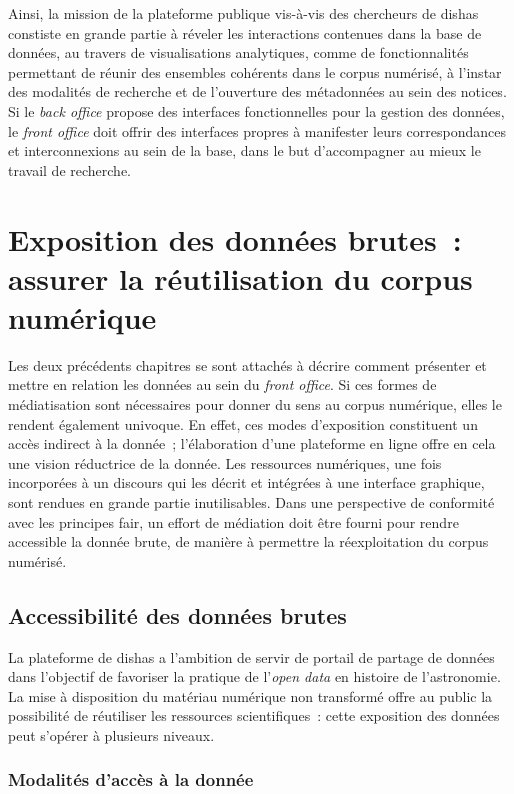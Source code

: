 \documentclass[a4paper,12pt,twoside]{book}
\newcommand{\clearemptydoublepage}{\newpage{\pagestyle{empty}\cleardoublepage}}
\newcommand{\eng}{\emph}
\newcommand{\bdd}{base de données\xspace}
\newcommand{\fo}{\eng{front office}\xspace}
\newcommand{\dishas}{\gls{dishas}\xspace}
\newcommand{\fair}{\gls{fair}\xspace}
\begin{document}
Ainsi, la mission de la plateforme publique vis-à-vis des chercheurs de \dishas constiste en grande partie à réveler les interactions contenues dans la \bdd, au travers de visualisations analytiques, comme de fonctionnalités permettant de réunir des ensembles cohérents dans le corpus numérisé, à l'instar des modalités de recherche et de l'ouverture des métadonnées au sein des notices. Si le \eng{back office} propose des interfaces fonctionnelles pour la gestion des données, le \fo doit offrir des interfaces propres à manifester leurs correspondances et interconnexions au sein de la base, dans le but d'accompagner au mieux le travail de recherche.

\clearemptydoublepage

\chapter[Assurer la réutilisation du corpus numérique]{Exposition des données brutes~: assurer la réutilisation du corpus numérique}
Les deux précédents chapitres se sont attachés à décrire comment présenter et mettre en relation les données au sein du \fo. Si ces formes de médiatisation sont nécessaires pour donner du sens au corpus numérique, elles le rendent également univoque. En effet, ces modes d'exposition constituent un accès indirect à la donnée~; l'élaboration d'une plateforme en ligne offre en cela une vision réductrice de la donnée. Les ressources numériques, une fois incorporées à un discours qui les décrit et intégrées à une interface graphique, sont rendues en grande partie inutilisables. Dans une perspective de conformité avec les principes \fair, un effort de médiation doit être fourni pour rendre accessible la donnée brute, de manière à permettre la réexploitation du corpus numérisé.

	\section{Accessibilité des données brutes}
La plateforme de \dishas a l'ambition de servir de portail de partage de données dans l'objectif de favoriser la pratique de l'\eng{open data} en histoire de l'astronomie. La mise à disposition du matériau numérique non transformé offre au public la possibilité de réutiliser les ressources scientifiques~: cette exposition des données peut s'opérer à plusieurs niveaux.

		\subsection{Modalités d'accès à la donnée}
\end{document}
